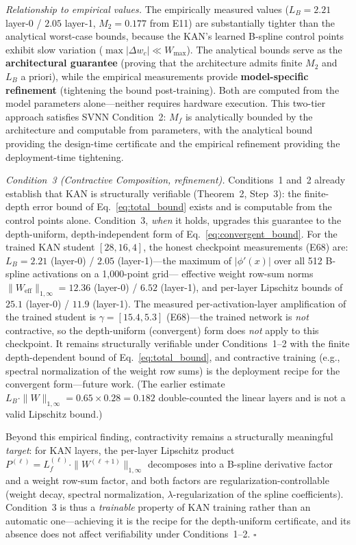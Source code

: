 \textit{Relationship to empirical values.}
The empirically measured values ($L_B = 2.21$ layer-0 / $2.05$ layer-1, $M_2 = 0.177$ from E11) are
substantially tighter than the analytical worst-case bounds, because the KAN's
learned B-spline control points exhibit slow variation ($\max|\Delta w_c| \ll
W_{\max}$). The analytical bounds serve as the \textbf{architectural guarantee}
(proving that the architecture admits finite $M_2$ and $L_B$ a priori), while
the empirical measurements provide \textbf{model-specific refinement}
(tightening the bound post-training). Both are computed from the model
parameters alone---neither requires hardware execution. This two-tier approach
satisfies SVNN Condition~2: $M_f$ is analytically bounded by the architecture
and computable from parameters, with the analytical bound providing the
design-time certificate and the empirical refinement providing the deployment-time
tightening.

\vspace{2pt}
\noindent\textit{Condition~3 (Contractive Composition, refinement).}
Conditions~1 and~2 already establish that KAN is structurally verifiable
(Theorem~2, Step~3): the finite-depth error bound of
Eq.~\ref{eq:total_bound} exists and is computable from the control points
alone. Condition~3, \emph{when} it holds, upgrades this guarantee to the
depth-uniform, depth-independent form of Eq.~\ref{eq:convergent_bound}.
For the trained KAN student $[28,16,4]$, the honest checkpoint measurements
(E68) are: $L_B = 2.21$ (layer-0) / $2.05$ (layer-1)---the maximum of
$|\phi'(x)|$ over all 512 B-spline activations on a 1,000-point grid---
effective weight row-sum norms $\|W_{\text{eff}}\|_{1,\infty} = 12.36$
(layer-0) / $6.52$ (layer-1), and per-layer Lipschitz bounds of $25.1$
(layer-0) / $11.9$ (layer-1). The measured per-activation-layer
amplification of the trained student is $\gamma = [15.4, 5.3]$ (E68)---the
trained network is \emph{not} contractive, so the depth-uniform
(convergent) form does \emph{not} apply to this checkpoint. It remains
structurally verifiable under Conditions~1--2 with the finite
depth-dependent bound of Eq.~\ref{eq:total_bound}, and contractive
training (e.g., spectral normalization of the weight row sums) is the
deployment recipe for the convergent form---future work. (The earlier
estimate $L_B \cdot \|W\|_{1,\infty} = 0.65 \times 0.28 = 0.182$
double-counted the linear layers and is not a valid Lipschitz bound.)

Beyond this empirical finding, contractivity remains a structurally
meaningful \emph{target}: for KAN layers, the per-layer Lipschitz product
$P^{(\ell)} = L_f^{(\ell)} \cdot \|W^{(\ell+1)}\|_{1,\infty}$ decomposes
into a B-spline derivative factor and a weight row-sum factor, and both
factors are regularization-controllable (weight decay, spectral
normalization, $\lambda$-regularization of the spline coefficients).
Condition~3 is thus a \emph{trainable} property of KAN training rather
than an automatic one---achieving it is the recipe for the depth-uniform
certificate, and its absence does not affect verifiability under
Conditions~1--2. $\square$

